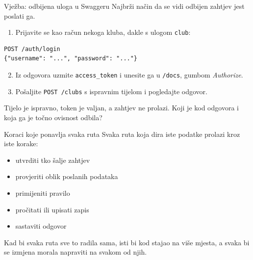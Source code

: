 \begin{frame}[fragile]{Vježba: odbijena uloga u Swaggeru}
Najbrži način da se vidi odbijen zahtjev jest poslati ga.

\vspace{1.1em}
\begin{enumerate}
  \itemsep0.6em
  \item Prijavite se kao račun nekoga kluba, dakle s ulogom \texttt{club}:
\end{enumerate}

\begin{lstlisting}
POST /auth/login
{"username": "...", "password": "..."}
\end{lstlisting}

\begin{enumerate}
  \setcounter{enumi}{1}
  \itemsep0.6em
  \item Iz odgovora uzmite \texttt{access\_token} i unesite ga u \texttt{/docs}, gumbom \emph{Authorize}.
  \item Pošaljite \texttt{POST /clubs} s ispravnim tijelom i pogledajte odgovor.
\end{enumerate}

\vspace{0.8em}
Tijelo je ispravno, token je valjan, a zahtjev ne prolazi. Koji je kod odgovora i koja ga je točno ovisnost odbila?
\end{frame}


\begin{frame}{Koraci koje ponavlja svaka ruta}
Svaka ruta koja dira iste podatke prolazi kroz iste korake:

\vspace{0.9em}
\begin{itemize}
  \itemsep0.6em
  \item utvrditi tko šalje zahtjev
  \item provjeriti oblik poslanih podataka
  \item primijeniti pravilo
  \item pročitati ili upisati zapis
  \item sastaviti odgovor
\end{itemize}

\vspace{1.1em}
Kad bi svaka ruta sve to radila sama, isti bi kod stajao na više mjesta, a svaka bi se izmjena morala napraviti na svakom od njih.
\end{frame}

